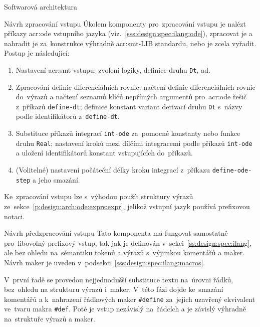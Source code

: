 \documentclass[thesis=M,czech]{FITthesis}[2012/06/26]
\newcommand{\acrlabel}[1]{acr:#1}
\newcommand{\acr}[1]{\acrshort{\acrlabel{#1}}}
\newcommand{\id}[1]{\texttt{#1}}
\newcommand{\rf}[1]{\ref{#1}}
\begin{document}
\begin{section}{Softwarová architektura}
\begin{subsection}{Návrh zpracování vstupu}\label{ss:design:arch:parse}
Úkolem komponenty pro~zpracování vstupu
je nalézt příkazy \acr{ode} vstupního jazyka
(viz.~\rf{sss:design:spec:ilang:ode}),
zpracovat je a nahradit je za~konstrukce
výhradně \acr{smt}-LIB standardu,
nebo je zcela vyřadit.
Postup je následující:
\begin{enumerate}
\item Nastavení \acr{smt} vstupu: zvolení logiky,
   definice druhu \id{Dt}, ad.
\item Zpracování definic diferenciálních rovnic:
   načtení definic diferenciálních rovnic do~výrazů
   a načtení seznamů klíčů nepřímých argumentů pro~\acr{ode} řešič
   z~příkazů \id{define\--dt};
   definice konstant variant derivací druhu \id{Dt}
   s~názvy podle identifikátorů z~\id{define\--dt}.
\item Substituce příkazů integrací \id{int\--ode}
   za~pomocné konstanty nebo funkce druhu \id{Real};
   nastavení kroků mezi dílčími integracemi
   podle příkazů \id{int\--ode}
   a uložení identifikátorů konstant vstupujících do~příkazů.
\item (Volitelné) nastavení počáteční délky kroku integrací
   z~příkazu \id{define\--ode\--step} a jeho smazání.
\end{enumerate}

Ke~zpracování vstupu lze s~výhodou
použít struktury výrazů
ze~sekce~\rf{p:design:arch:ode:exprs:expr},
jelikož vstupní jazyk používá prefixovou notaci.
\end{subsection} %


\begin{subsection}{Návrh předzpracování vstupu}
\label{ss:design:arch:preprocess}
Tato komponenta má fungovat samostatně pro~libovolný prefixový vstup,
tak jak je definován v~sekci~\rf{ss:design:spec:ilang},
ale bez ohledu na~sémantiku tokenů a výrazů
s~výjimkou komentářů a maker.
Návrh maker je uveden v~podsekci~\rf{sss:design:spec:ilang:macros}.

V~první řadě se provedou nejjednodušší substituce textu
na~úrovni řádků, bez~ohledu na strukturu výrazů i~maker.
V~této fázi dojde ke~smazání komentářů
a k~nahrazení řádkových maker \id{\#define}
za~jejich uzavřený ekvivalent ve~tvaru makra \id{\#def}.
Poté je vstup nezávislý na~řádcích
a je závislý výhradně na~struktuře výrazů a maker.


\end{subsection}
\end{section}
\end{document}
